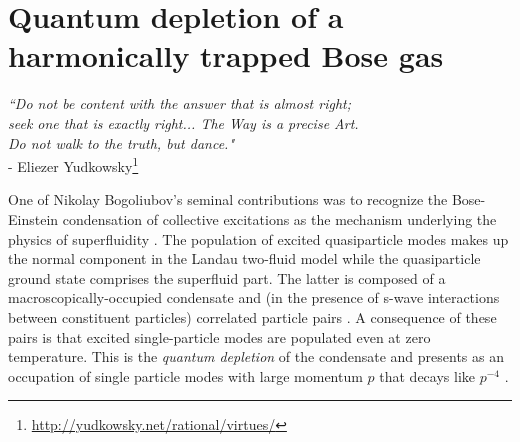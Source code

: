 \chapter{Quantum depletion of a harmonically trapped Bose gas}
\label{chap:QD}

\begin{adjustwidth}{2cm}{0cm}
\begin{flushright}
\singlespacing
\emph{``Do not be content with the answer that is almost right; \\
	seek one that is exactly right... The Way is a precise Art.\\
	Do not walk to the truth, but dance."} 
	\\- Eliezer Yudkowsky\footnote{\url{http://yudkowsky.net/rational/virtues/}}
\end{flushright}
\end{adjustwidth}
\onehalfspacing
\vspace{1cm}



	{One} of Nikolay Bogoliubov's seminal contributions was to recognize the Bose-Einstein condensation of collective excitations as the mechanism underlying the physics of superfluidity \cite{Bogoliubov47}.
	The population of excited quasiparticle modes makes up the normal component in the Landau two-fluid model while the %
	quasiparticle ground state comprises the superfluid part. {The latter is composed of a macroscopically-occupied condensate and (in the presence of s-wave interactions between constituent particles) correlated particle pairs \cite{Bogoliubov47,Vogels02}}.
	{A consequence of these pairs is  that excited} single-particle modes are populated even at zero temperature.
	This is the \emph{quantum depletion} of the condensate and presents as an occupation of single particle modes with large momentum $p$ that decays like $p^{-4}$ \cite{PitaevskiiStringari,Decamp18}.

